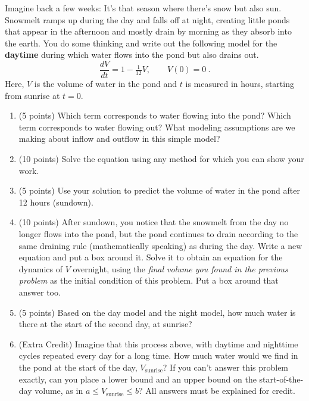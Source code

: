 \documentclass[11pt,onecolumn,superscriptaddress,notitlepage]{article}
\newcommand{\aaa}[0]{5 }
\newcommand{\bbb}[0]{10 }
\begin{document}
Imagine back a few weeks: It's that season where there's snow but also sun. Snowmelt ramps up during the day and falls off at night, creating little ponds that appear in the afternoon and mostly drain by morning as they absorb into the earth. You do some thinking and write out the following model for the {\bf daytime} during which water flows into the pond but also drains out.
\begin{equation}
	\frac{dV}{dt} = 1-\tfrac{1}{12}V, \qquad V(0)=0\ .
\end{equation}
Here, $V$ is the volume of water in the pond and $t$ is measured in hours, starting from sunrise at $t=0$.
\begin{enumerate}[resume]
	\item (\aaa points) Which term corresponds to water flowing into the pond? Which term corresponds to water flowing out? What modeling assumptions are we making about inflow and outflow in this simple model?
	\vspace{1.0in}
	
	\item (\bbb points) Solve the equation using any method for which you can show your work.
	\vspace{2.5in}
	
	\item (\aaa points) Use your solution to predict the volume of water in the pond after 12 hours (sundown).
	\vspace{0.5in}
	
	\pagebreak
	\item (\bbb points) After sundown, you notice that the snowmelt from the day no longer flows into the pond, but the pond continues to drain according to the same draining rule (mathematically speaking) as during the day. Write a new equation and put a box around it. Solve it to obtain an equation for the dynamics of $V$ overnight, using the {\it final volume you found in the previous problem} as the initial condition of this problem. Put a box around that answer too. 
	\vspace{2.5in}
		
	\item (\aaa points) Based on the day model and the night model, how much water is there at the start of the second day, at sunrise? 
	\vspace{1.0in}
		
	\item (Extra Credit) Imagine that this process above, with daytime and nighttime cycles repeated every day for a long time. How much water would we find in the pond at the start of the day, $V_\text{sunrise}$? If you can't answer this problem exactly, can you place a lower bound and an upper bound on the start-of-the-day volume, as in $a \leq V_\text{sunrise} \leq b$? All answers must be explained for credit. 
\end{enumerate}
\end{document}
